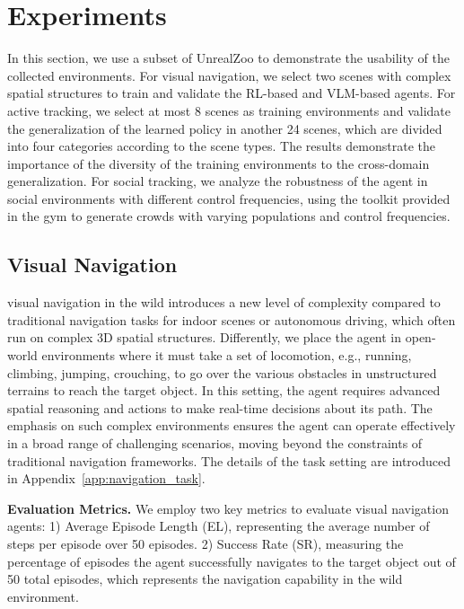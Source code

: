 \documentclass{article}
\begin{document}
\vspace{-0.3cm}
\section{Experiments}
\vspace{-0.3cm}
In this section, we use a subset of UnrealZoo to demonstrate the usability of the collected environments. For visual navigation, we select two scenes with complex spatial structures to train and validate the RL-based and VLM-based agents.
For active tracking, we select at most 8 scenes as training environments and validate the generalization of the learned policy in another 24 scenes, which are divided into four categories according to the scene types. The results demonstrate the importance of the diversity of the training environments to the cross-domain generalization.
For social tracking, we analyze the robustness of the agent in social environments with different control frequencies, using the toolkit provided in the gym to generate crowds with varying populations and control frequencies.

\vspace{-0.2cm}
\subsection{Visual Navigation} 
\vspace{-0.2cm}

visual navigation in the wild introduces a new level of complexity compared to traditional navigation tasks for indoor scenes or autonomous driving, which often run on complex 3D spatial structures. 
Differently, we place the agent in open-world environments where it must take a set of locomotion, e.g., running, climbing, jumping, crouching, to go over the various obstacles in unstructured terrains to reach the target object. In this setting, the agent requires advanced spatial reasoning and actions to make real-time decisions about its path. 
The emphasis on such complex environments ensures the agent can operate effectively in a broad range of challenging scenarios, moving beyond the constraints of traditional navigation frameworks. The details of the task setting are introduced in Appendix~\ref{app:navigation_task}.

\textbf{Evaluation Metrics.}
We employ two key metrics to evaluate visual navigation agents: 1) Average Episode Length (EL), representing the average number of steps per episode over 50 episodes. 2) Success Rate (SR), measuring the percentage of episodes the agent successfully navigates to the target object out of 50 total episodes, which represents the navigation capability in the wild environment.
\end{document}
